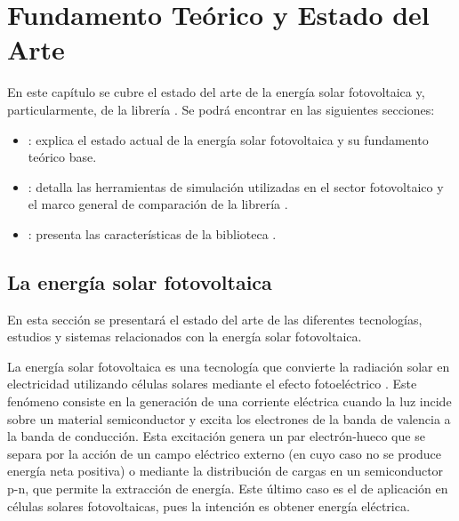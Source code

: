 \chapter{Fundamento Teórico y Estado del Arte} \label{chp:state-of-the-art}

En este capítulo se cubre el estado del arte de la energía solar \gls{fotovoltaica} y, particularmente, de la \gls{librería} \pvlibpy. Se podrá encontrar en las siguientes secciones:

\begin{itemize}

      \item {}: explica el estado actual de la energía solar \gls{fotovoltaica} y su fundamento teórico base.

      \item {}: detalla las herramientas de \gls{simulación} utilizadas en el sector fotovoltaico y el marco general de comparación de la librería \pvlibpy.

      \item {}: presenta las características de la biblioteca \pvlibpy.

\end{itemize}


\section{La energía solar fotovoltaica} \label{sct:energia-solar}

En esta sección se presentará el estado del arte de las diferentes tecnologías, estudios y sistemas relacionados con la energía solar fotovoltaica.

La energía solar \gls{fotovoltaica} es una tecnología que convierte la \gls{radiación solar} en electricidad utilizando células solares mediante el \gls{efecto fotoeléctrico} \cite[][pp. 701-706]{böer2002survey}.
Este fenómeno consiste en la generación de una corriente eléctrica cuando la luz incide sobre un material \gls{semiconductor} y excita los electrones de la \gls{banda de valencia} a la \gls{banda de conducción}. Esta excitación genera un \gls{par electrón-hueco} que se separa por la acción de un campo eléctrico externo (en cuyo caso no se produce energía neta positiva) o mediante la distribución de cargas en un \gls{semiconductor} p-n, que permite la extracción de energía. Este último caso es el de aplicación en células solares fotovoltaicas, pues la intención es obtener energía eléctrica.


